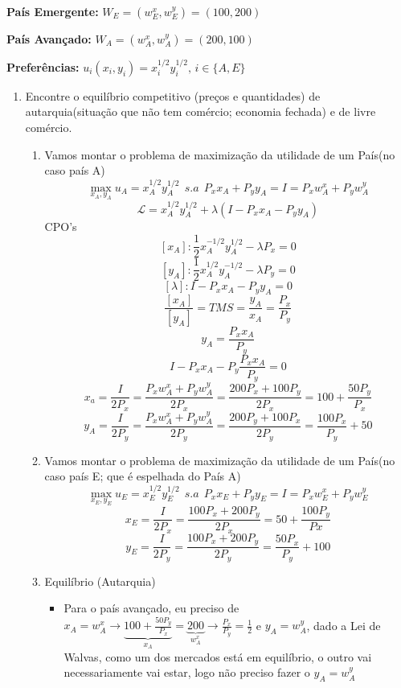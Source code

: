 \documentclass[a4paper,12pt]{article}[abntex2]
\begin{document}
\textbf{País Emergente:} $W_E = (w_E^x, w_E^y) = (100, 200)$ 

\textbf{País Avançado:} $W_A = (w_A^x, w_A^y) = (200, 100)$ 

\textbf{Preferências:} $u_i(x_i, y_i) = x_i^{1/2} y_i^{1/2}, \, i \in \{A, E\}$

\begin{enumerate}
    \item Encontre o equilíbrio competitivo (preços e quantidades) de autarquia(situação que não tem comércio; economia fechada) e de livre comércio.\begin{enumerate}
        \item Vamos montar o problema de maximização da utilidade de um País(no caso país A)
        \[
        \max_{x_A,y_A}u_A=x_A^{1/2}y_A^{1/2} \ \ s.a \ \ P_xx_A+P_yy_A=I=P_xw_A^x+P_yw_A^y
        \]
        \[
        \mathcal{L}=x_A^{1/2}y_A^{1/2} +\lambda(I-P_xx_A-P_yy_A)
        \]
        CPO's
        \[
        [x_A]:\frac{1}{2}x_A^{-1/2}y_A^{1/2}-\lambda P_x=0
        \]
        \[
        [y_A]:\frac{1}{2}x_A^{1/2}y_A^{-1/2}-\lambda P_y=0
        \]
        \[
        [\lambda]:I-P_xx_A-P_yy_A=0
        \]
        \[
        \frac{[x_A]}{[y_A]}=TMS=\frac{y_A}{x_A}=\frac{P_x}{P_y}
        \]
        \[
        y_A=\frac{P_xx_A}{P_y}
        \]
        \[
        I-P_xx_A-P_y\frac{P_xx_A}{P_y}=0 
        \]
        \[
        x_a=\frac{I}{2P_x} = \frac{P_xw_A^x+P_yw_A^y}{2P_x}=\frac{200P_x+100P_y}{2P_x}=100+\frac{50P_y}{P_x}
        \]
        \[
        y_A=\frac{I}{2P_y}=\frac{P_xw_A^x+P_yw_A^y}{2P_y}=\frac{200P_y+100P_x}{2P_y}=\frac{100P_x}{P_y}+50
        \]
    \item Vamos montar o problema de maximização da utilidade de um País(no caso país E; que é espelhada do País A)
        \[
        \max_{x_E,y_E}u_E=x_E^{1/2}y_E^{1/2} \ \ s.a \ \ P_xx_E+P_yy_E=I=P_xw_E^x+P_yw_E^y
        \]
        \[
        x_E=\frac{I}{2P_x}=\frac{100P_x+200P_y}{2P_x}=50+\frac{100P_y}{Px}
        \]
        \[
        y_E=\frac{I}{2P_y}=\frac{100P_x+200P_y}{2P_y}=\frac{50P_x}{P_y}+100
        \]
    \item Equilíbrio (Autarquia)\begin{itemize}
        \item Para o país avançado, eu preciso de \(x_A=w_A^x\rightarrow \underbrace{100+\frac{50P_y}{P_x}}_{x_A}=\underbrace{200}_{w_A^x}\rightarrow \frac{P_x}{P_y}=\frac{1}{2}\) e \(y_A=w_A^y\), dado a Lei de Walvas, como um dos mercados está em equilíbrio, o outro vai necessariamente vai estar, logo não preciso fazer o \(y_A=w_A^y\)

\end{itemize}
\end{enumerate}
\end{enumerate}
\end{document}
